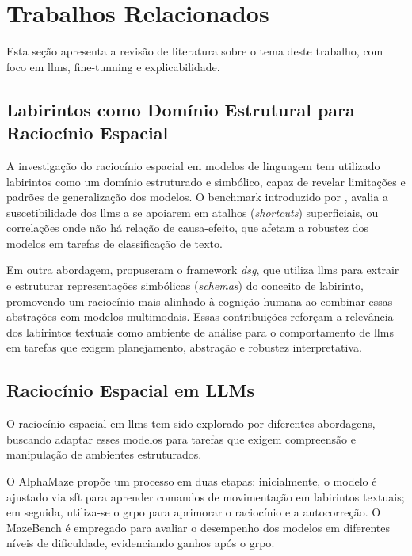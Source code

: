 \chapter{Trabalhos Relacionados}
\label{cap:trabalhos:relacionados}

Esta seção apresenta a revisão de literatura sobre o tema deste trabalho, com foco em \gls{llms}, fine-tunning e explicabilidade.

\section{Labirintos como Domínio Estrutural para Raciocínio Espacial}

A investigação do raciocínio espacial em modelos de linguagem tem utilizado labirintos como um domínio estruturado e simbólico, capaz de revelar limitações e padrões de generalização dos modelos. O benchmark introduzido por \cite{zhou2024navigatingshortcutmazecomprehensive}, avalia a suscetibilidade dos \gls{llms} a se apoiarem em atalhos (\textit{shortcuts}) superficiais, ou correlações onde não há relação de causa-efeito, que afetam a robustez dos modelos em tarefas de classificação de texto.

Em outra abordagem, \cite{hsu2025whatmakesmazelooklike} propuseram o framework \textit{\gls{dsg}}, que utiliza \gls{llms} para extrair e estruturar representações simbólicas (\textit{schemas}) do conceito de labirinto, promovendo um raciocínio mais alinhado à cognição humana ao combinar essas abstrações com modelos multimodais. Essas contribuições reforçam a relevância dos labirintos textuais como ambiente de análise para o comportamento de \gls{llms} em tarefas que exigem planejamento, abstração e robustez interpretativa.

\section{Raciocínio Espacial em LLMs}

O raciocínio espacial em \gls{llms} tem sido explorado por diferentes abordagens, buscando adaptar esses modelos para tarefas que exigem compreensão e manipulação de ambientes estruturados.

O AlphaMaze \cite{dao2025alphamaze} propõe um processo em duas etapas: inicialmente, o modelo é ajustado via \gls{sft} para aprender comandos de movimentação em labirintos textuais; em seguida, utiliza-se o \gls{grpo} para aprimorar o raciocínio e a autocorreção. O MazeBench é empregado para avaliar o desempenho dos modelos em diferentes níveis de dificuldade, evidenciando ganhos após o \gls{grpo}.

